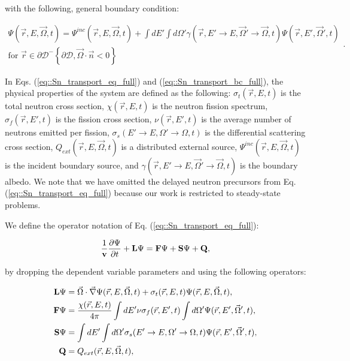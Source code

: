 \noindent with the following, general boundary condition:

\begin{equation}
\label{eq::Sn_transport_bc_full}
\begin{aligned}
	\Psi (\vec{r}, E, \vec{\Omega},t) = \Psi^{inc} (\vec{r}, E, \vec{\Omega},t) + \int dE' \int d\Omega' \gamma (\vec{r}, E' \rightarrow E, \vec{\Omega}' \rightarrow \vec{\Omega},t) \Psi (\vec{r}, E', \vec{\Omega}',t) \\
	\text{for } \vec{r} \in \partial \mathcal{D}^{-} \left\{   \partial \mathcal{D}, \vec{\Omega} \cdot \vec{n} < 0  \right\}
\end{aligned} .
\end{equation}

\noindent In Eqs. (\ref{eq::Sn_transport_eq_full}) and (\ref{eq::Sn_transport_bc_full}), the physical properties of the system are defined as the following: $\sigma_t (\vec{r}, E,t)$ is the total neutron cross section, $\chi (\vec{r}, E,t)$ is the neutron fission spectrum, $\sigma_f (\vec{r}, E',t)$ is the fission cross section, $\nu (\vec{r}, E',t)$ is the average number of neutrons emitted per fission, $\sigma_s (E' \rightarrow E, \Omega' \rightarrow \Omega,t)$ is the differential scattering cross section, $Q_{ext} (\vec{r}, E, \vec{\Omega},t)$ is a distributed external source, $\Psi^{inc} (\vec{r}, E, \vec{\Omega},t)$ is the incident boundary source, and $\gamma (\vec{r}, E' \rightarrow E, \vec{\Omega}' \rightarrow \vec{\Omega},t)$ is the boundary albedo. We note that we have omitted the delayed neutron precursors from Eq. (\ref{eq::Sn_transport_eq_full}) because our work is restricted to steady-state problems.

We define the operator notation of Eq. (\ref{eq::Sn_transport_eq_full}):

\begin{equation}
\label{eq::Sn_transport_eq_op}
	\frac{1}{{\bf v}} \frac{\partial \Psi}{\partial t} + {\bf L} \Psi =  {\bf F} \Psi  + {\bf S} \Psi + {\bf Q},
\end{equation}

\noindent by dropping the dependent variable parameters and using the following operators:

\begin{equation}
\label{eq::Sn_transport_operators}
\begin{aligned}
	{\bf L} \Psi &= \vec{\Omega} \cdot \vec{\nabla} \Psi (\vec{r}, E, \vec{\Omega},t)+ \sigma_t (\vec{r}, E,t) \Psi (\vec{r}, E, \vec{\Omega},t), \\
	{\bf F} \Psi &= \frac{\chi (\vec{r}, E,t)}{4 \pi} \int dE' \nu \sigma_f (\vec{r}, E',t) \int d\Omega' \Psi (\vec{r}, E', \vec{\Omega}',t), \\
	{\bf S} \Psi &= \int dE' \int d\Omega' \sigma_s (E' \rightarrow E, \Omega' \rightarrow \Omega, t) \Psi (\vec{r}, E', \vec{\Omega}', t),  \\
	{\bf Q}       & = Q_{ext} (\vec{r}, E, \vec{\Omega},t) ,
\end{aligned}
\end{equation}

